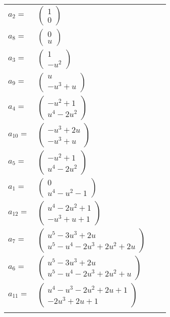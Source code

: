 \documentclass[1p]{elsarticle_modified}
\theoremstyle{definition}
\begin{document}
\begin{tabular}{m{7pt} m{180pt} m{7pt} m{180pt} }
\flushright $a_{2}=$&$\begin{pmatrix}1\\0\end{pmatrix}$ \\
\flushright $a_{8}=$&$\begin{pmatrix}0\\u\end{pmatrix}$ \\
\flushright $a_{3}=$&$\begin{pmatrix}1\\- u^2\end{pmatrix}$ \\
\flushright $a_{9}=$&$\begin{pmatrix}u\\- u^3+u\end{pmatrix}$ \\
\flushright $a_{4}=$&$\begin{pmatrix}- u^2+1\\u^4-2 u^2\end{pmatrix}$ \\
\flushright $a_{10}=$&$\begin{pmatrix}- u^3+2 u\\- u^3+u\end{pmatrix}$ \\
\flushright $a_{5}=$&$\begin{pmatrix}- u^2+1\\u^4-2 u^2\end{pmatrix}$ \\
\flushright $a_{1}=$&$\begin{pmatrix}0\\u^4- u^2-1\end{pmatrix}$ \\
\flushright $a_{12}=$&$\begin{pmatrix}u^4-2 u^2+1\\- u^3+u+1\end{pmatrix}$ \\
\flushright $a_{7}=$&$\begin{pmatrix}u^5-3 u^3+2 u\\u^5- u^4-2 u^3+2 u^2+2 u\end{pmatrix}$ \\
\flushright $a_{6}=$&$\begin{pmatrix}u^5-3 u^3+2 u\\u^5- u^4-2 u^3+2 u^2+u\end{pmatrix}$ \\
\flushright $a_{11}=$&$\begin{pmatrix}u^4- u^3-2 u^2+2 u+1\\-2 u^3+2 u+1\end{pmatrix}$\\&\end{tabular}
\end{document}
